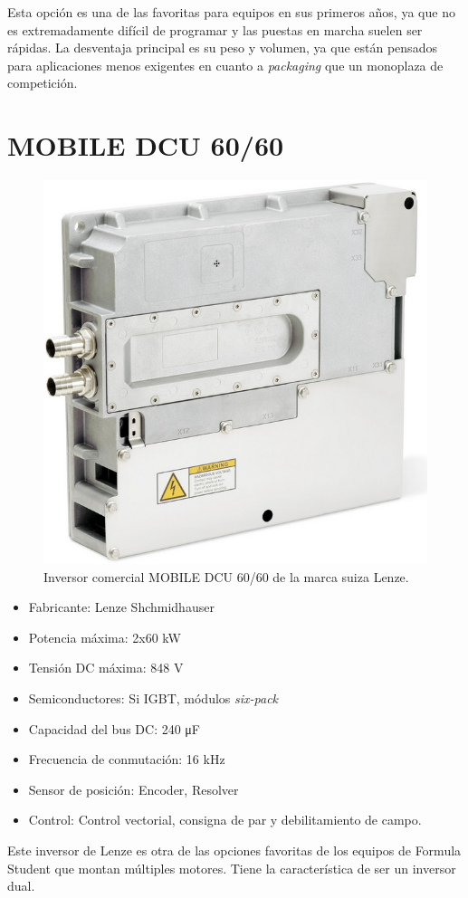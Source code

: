 Esta opción es una de las favoritas para equipos en sus primeros años, ya que no es extremadamente difícil de programar y las puestas en marcha suelen ser rápidas. La desventaja principal es su peso y volumen, ya que están pensados para aplicaciones menos exigentes en cuanto a \textit{packaging} que un monoplaza de competición.

\section{MOBILE DCU 60/60}
\begin{figure}[H]
	\centering
	\includegraphics[width=0.5\linewidth]{fig/lenze}
	\caption{Inversor comercial MOBILE DCU 60/60 de la marca suiza Lenze. \cite{bucherdrives_mobile_dcu}}
	\label{fig:lenze}
\end{figure}

\begin{itemize}
\item Fabricante: Lenze Shchmidhauser
\item Potencia máxima: 2x60 kW
\item Tensión DC máxima: 848 V
\item Semiconductores: Si IGBT, módulos \textit{six-pack}
\item Capacidad del bus DC: 240 \unit{\micro\farad}
\item Frecuencia de conmutación: 16 kHz
\item Sensor de posición: Encoder, Resolver
\item Control: Control vectorial, consigna de par y debilitamiento de campo.
\end{itemize}

Este inversor de Lenze es otra de las opciones favoritas de los equipos de Formula Student que montan múltiples motores. Tiene la característica de ser un inversor dual. 

